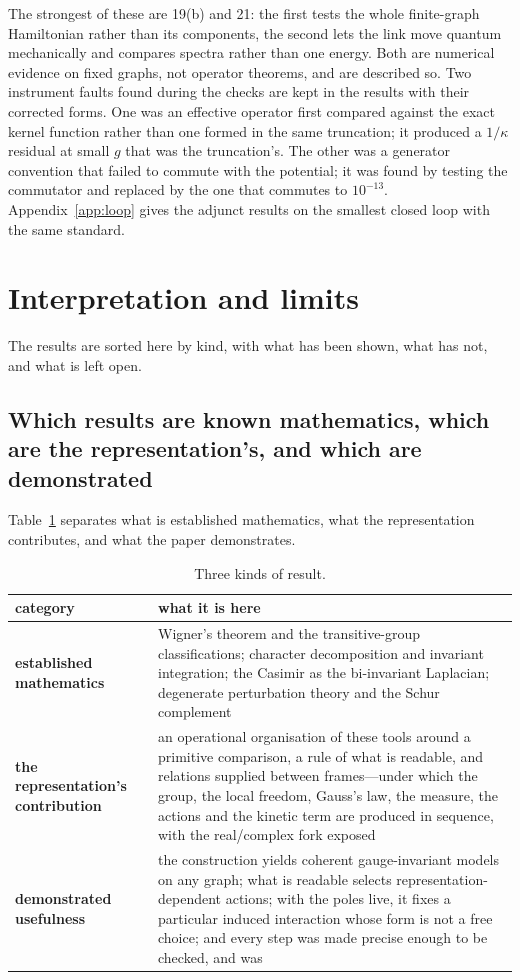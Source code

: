 \documentclass[11pt,a4paper]{article}
\theoremstyle{plain}
\theoremstyle{definition}
\theoremstyle{remark}
\begin{document}
The strongest of these are 19(b) and 21: the first tests the whole finite-graph Hamiltonian rather than its components, the second lets the link move quantum mechanically and compares spectra rather than one energy. Both are numerical evidence on fixed graphs, not operator theorems, and are described so. Two instrument faults found during the checks are kept in the results with their corrected forms. One was an effective operator first compared against the exact kernel function rather than one formed in the same truncation; it produced a $1/\kappa$ residual at small $g$ that was the truncation's. The other was a generator convention that failed to commute with the potential; it was found by testing the commutator and replaced by the one that commutes to $10^{-13}$. Appendix~\ref{app:loop} gives the adjunct results on the smallest closed loop with the same standard.

\clearpage
\section{Interpretation and limits}\label{sec:interp}

The results are sorted here by kind, with what has been shown, what has not, and what is left open.

\subsection{Which results are known mathematics, which are the representation's, and which are demonstrated}

Table~\ref{tab:kinds} separates what is established mathematics, what the representation contributes, and what the paper demonstrates.

\begin{table}[!htbp]
\centering\small
\caption{Three kinds of result.}
\label{tab:kinds}
\begin{tabular}{@{}>{\raggedright\arraybackslash}p{3.6cm}>{\raggedright\arraybackslash}p{11.6cm}@{}}
\toprule
category & what it is here\\
\midrule
\textbf{established mathematics} & Wigner's theorem and the transitive-group classifications; character decomposition and invariant integration; the Casimir as the bi-invariant Laplacian; degenerate perturbation theory and the Schur complement\\
\addlinespace
\textbf{the representation's contribution} & an operational organisation of these tools around a primitive comparison, a rule of what is readable, and relations supplied between frames---under which the group, the local freedom, Gauss's law, the measure, the actions and the kinetic term are produced in sequence, with the real/complex fork exposed\\
\addlinespace
\textbf{demonstrated usefulness} & the construction yields coherent gauge-invariant models on any graph; what is readable selects representation-dependent actions; with the poles live, it fixes a particular induced interaction whose form is not a free choice; and every step was made precise enough to be checked, and was\\
\bottomrule
\end{tabular}
\end{table}
\end{document}
